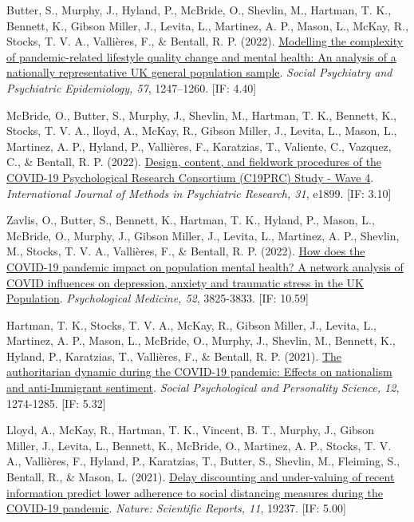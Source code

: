 \documentclass[12pt]{article}
\begin{document}
\begin{bibenum}
\item Butter, S.,  Murphy, J., Hyland, P., 
		McBride, O., Shevlin, M., Hartman, T. K., 
		Bennett, K., Gibson Miller, J., Levita, L., 
		Martinez, A. P., Mason, L., McKay, R., 
		Stocks, T. V. A., Vallières, F., 
		\& Bentall, R. P. (2022). 
		\href{https://doi.org/10.1007/s00127-021-02210-w}
		{Modelling the complexity of 
		pandemic-related lifestyle quality change 
		and mental health: An analysis of a 
		nationally representative UK general 
		population sample}. 
		\emph{Social Psychiatry and 
		Psychiatric Epidemiology, 57}, 1247–1260. 
		[IF: 4.40]
		
\item McBride, O., Butter, S., Murphy, J., 
		Shevlin, M., Hartman, T. K., 
		Bennett, K.,  Stocks, T. V. A., 
		lloyd, A., McKay, R., Gibson Miller, J.,  
		Levita, L., Mason, L., Martinez, A. P.,  
		Hyland, P., Vallières, F., Karatzias, T., 
		Valiente, C., Vazquez, C., 
		\& Bentall, R. P. (2022). 
		\href{https://doi.org/10.1002/mpr.1899}
		{Design, content, and fieldwork procedures 
		of the COVID-19 Psychological Research 
		Consortium (C19PRC) Study - Wave 4}.
		\emph{International Journal of Methods 
		in Psychiatric Research, 31}, e1899. 
		[IF: 3.10]
	
\item Zavlis, O., Butter, S., Bennett, K., 
	Hartman, T. K., Hyland, P., Mason, L., 
	McBride, O., Murphy, J., Gibson Miller, J., 
	Levita, L., Martinez, A. P., Shevlin, M., 
	Stocks, T. V. A., Vallières, F., \& Bentall, R. P.
	(2022). 
	\href{https://doi.org/10.1017/S0033291721000635}
	{How does the COVID-19 pandemic impact on 
	population mental health? A network analysis 
	of COVID influences on depression, anxiety 
	and traumatic stress in the UK Population}. 
	\emph{Psychological Medicine, 52}, 3825-3833. 
	[IF: 10.59]
	
\item Hartman, T. K.,  Stocks, T. V. A., 
		McKay, R., Gibson Miller, J., Levita, L., 
		Martinez, A. P., Mason, L., McBride, O., 
		Murphy, J., Shevlin, M., Bennett, K., 
		Hyland, P., Karatzias, T., Vallières, F., 
		\& Bentall, R. P. (2021). 
		\href{https://doi.org/10.1177/1948550620978023}
		{The authoritarian dynamic during the 
		COVID-19 pandemic: Effects on nationalism and 
		anti-Immigrant sentiment}.
		\emph{Social Psychological and 
		Personality Science, 12}, 1274-1285. 
		[IF: 5.32]

\item Lloyd, A., McKay, R., Hartman, T. K., 
		Vincent, B. T., Murphy, J., 
		Gibson Miller, J., Levita, L., 
		Bennett, K., McBride, O.,  
		Martinez, A. P., Stocks, T. V. A., 
		Vallières, F., Hyland, P., Karatzias, T., 
		Butter, S., Shevlin, M., Fleiming, S., 
		Bentall, R., \& Mason, L.  (2021). 
		\href{https://psyarxiv.com/kvynr/}
		{Delay discounting and under-valuing 
		of recent information predict lower adherence 
		to social distancing measures during 
		the COVID-19 pandemic}.
		\emph{Nature: Scientific Reports, 11}, 19237. 
		[IF: 5.00]
		

\end{bibenum}
\end{document}

